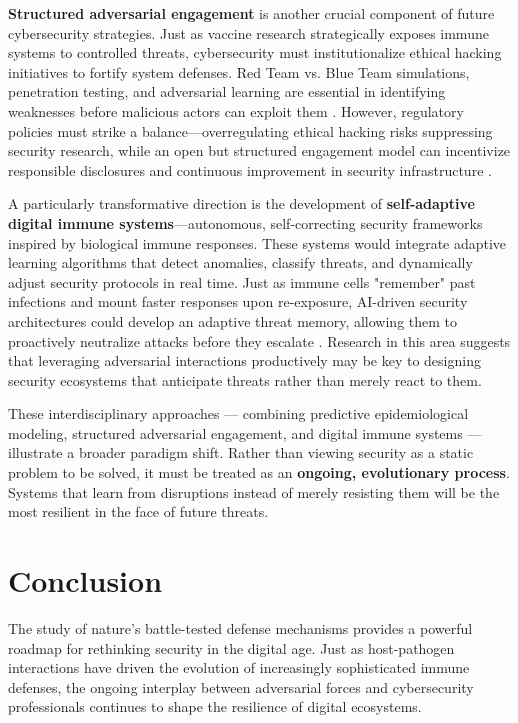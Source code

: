 \documentclass{article}
\begin{document}
\textbf{Structured adversarial engagement} is another crucial component of future cybersecurity strategies. Just as vaccine research strategically exposes immune systems to controlled threats, cybersecurity must institutionalize ethical hacking initiatives to fortify system defenses. Red Team vs. Blue Team simulations, penetration testing, and adversarial learning are essential in identifying weaknesses before malicious actors can exploit them \citep{dobson1989population}. However, regulatory policies must strike a balance—overregulating ethical hacking risks suppressing security research, while an open but structured engagement model can incentivize responsible disclosures and continuous improvement in security infrastructure \citep{holt2012hackers}.

A particularly transformative direction is the development of \textbf{self-adaptive digital immune systems}—autonomous, self-correcting security frameworks inspired by biological immune responses. These systems would integrate adaptive learning algorithms that detect anomalies, classify threats, and dynamically adjust security protocols in real time. Just as immune cells "remember" past infections and mount faster responses upon re-exposure, AI-driven security architectures could develop an adaptive threat memory, allowing them to proactively neutralize attacks before they escalate \citep{chang2020modelling}. Research in this area suggests that leveraging adversarial interactions productively may be key to designing security ecosystems that anticipate threats rather than merely react to them.

These interdisciplinary approaches — combining predictive epidemiological modeling, structured adversarial engagement, and digital immune systems — illustrate a broader paradigm shift. Rather than viewing security as a static problem to be solved, it must be treated as an \textbf{ongoing, evolutionary process}. Systems that learn from disruptions instead of merely resisting them will be the most resilient in the face of future threats.

\section{Conclusion}
The study of nature’s battle-tested defense mechanisms provides a powerful roadmap for rethinking security in the digital age. Just as host-pathogen interactions have driven the evolution of increasingly sophisticated immune defenses, the ongoing interplay between adversarial forces and cybersecurity professionals continues to shape the resilience of digital ecosystems. 
\end{document}
